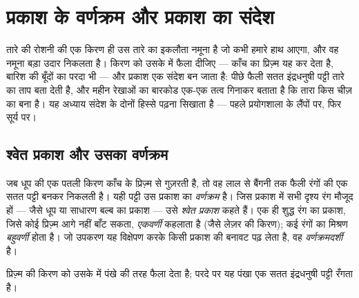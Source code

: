 \chapter{प्रकाश के वर्णक्रम और प्रकाश का संदेश}\label{ch:g10:light-spectra}

तारे की रोशनी की एक किरण ही उस तारे का इकलौता नमूना है जो कभी हमारे हाथ
आएगा, और वह नमूना बड़ा उदार निकलता है। किरण को उसके  में
फैला दीजिए --- काँच का प्रिज़्म यह कर देता है, बारिश की बूँदों का परदा
भी --- और प्रकाश एक संदेश बन जाता है: पीछे फैली सतत इंद्रधनुषी पट्टी
तारे का ताप बता देती है, और महीन रेखाओं का बारकोड एक-एक तत्व गिनाकर
बताता है कि तारा किस चीज़ का बना है। यह अध्याय संदेश के दोनों हिस्से
पढ़ना सिखाता है --- पहले प्रयोगशाला के लैंपों पर, फिर सूर्य पर।

\section{श्वेत प्रकाश और उसका वर्णक्रम}

\begin{definition}[श्वेत प्रकाश का वर्ण-विक्षेपण]\label{def:g10:light-spectra:white}
जब धूप की एक पतली किरण काँच के प्रिज़्म से गुज़रती है, तो वह लाल से
बैंगनी तक फैली रंगों की एक सतत पट्टी बनकर निकलती है। यही पट्टी उस प्रकाश
का \emph{वर्णक्रम} है। जिस प्रकाश में सभी दृश्य रंग
मौजूद हों --- जैसे धूप या साधारण बल्ब का प्रकाश --- उसे \emph{श्वेत
प्रकाश} कहते हैं। एक ही शुद्ध रंग का प्रकाश, जिसे
कोई प्रिज़्म आगे नहीं बाँट सकता, \emph{एकवर्णी}
कहलाता है (जैसे लेज़र की किरण); कई रंगों का मिश्रण
\emph{बहुवर्णी} होता है। जो उपकरण यह विक्षेपण
करके किसी प्रकाश की बनावट पढ़ लेता है, वह
\emph{वर्णक्रमदर्शी} है।
\end{definition}

\begin{omfigure}

{\small प्रिज़्म  की किरण को उसके  में
पंखे की तरह फैला देता है; परदे पर यह पंखा एक सतत इंद्रधनुषी पट्टी
रँगता है।}
\end{omfigure}

